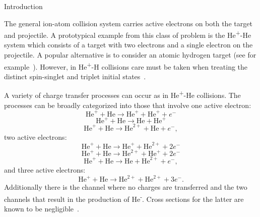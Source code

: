 \documentclass[aps, pra, reprint, groupedaddress, amsfonts, longbibliography,
               amsmath, amssymb, showpacs, nofootinbib]{revtex4-1}
\begin{document}
\begin{section}{Introduction \label{sec:intro}}

   The general ion-atom collision system carries active electrons on both the target and projectile. A
   prototypical example from this class of problem is the He\textsuperscript{+}-He system which consists
   of a target with two electrons and a single electron on the projectile. A popular alternative is to
   consider an atomic hydrogen target (see for example~\cite{hEx1, hEx2}). However, in
   He\textsuperscript{+}-H collisions care must be taken when treating the distinct spin-singlet and
   triplet initial states~\cite{heph}.

   A variety of charge transfer processes can occur as in He\textsuperscript{+}-He collisions. The
   processes can be broadly categorized into those that involve one active electron:
   \begin{equation} \label{eq:tpi111}
      \mathrm{He}^+ + \mathrm{He} \rightarrow \mathrm{He}^+ + \mathrm{He}^+ + e^-
   \end{equation}
   \begin{equation} \label{eq:tpi120}
      \mathrm{He}^+ + \mathrm{He} \rightarrow \mathrm{He} + \mathrm{He}^+
   \end{equation}
   \begin{equation} \label{eq:tpi201}
      \mathrm{He}^+ + \mathrm{He} \rightarrow \mathrm{He}^{2+} + \mathrm{He} + e^-,
   \end{equation}
   two active electrons:
   \begin{equation} \label{eq:tpi012}
      \mathrm{He}^+ + \mathrm{He} \rightarrow \mathrm{He}^+ + \mathrm{He}^{2+} + 2e^-
   \end{equation}
   \begin{equation} \label{eq:tpi102}
      \mathrm{He}^+ + \mathrm{He} \rightarrow \mathrm{He}^{2+} + \mathrm{He}^+ + 2e^-
   \end{equation}
   \begin{equation} \label{eq:tpi021}
      \mathrm{He}^+ + \mathrm{He} \rightarrow \mathrm{He} + \mathrm{He}^{2+} + e^-,
   \end{equation}
   and three active electrons:
   \begin{equation} \label{eq:tpi003}
      \mathrm{He}^+ + \mathrm{He} \rightarrow \mathrm{He}^{2+} + \mathrm{He}^{2+} + 3e^{-}.
   \end{equation}
   Additionally there is the channel where no charges are transferred and the two channels that result
   in the production of He\textsuperscript{-}. Cross sections for the latter are known to be
   negligible~\cite{metahe, neghe-neg}.


\end{section}
\end{document}
